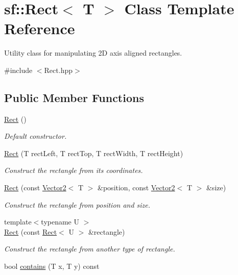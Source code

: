\hypertarget{classsf_1_1Rect}{\section{sf\-:\-:Rect$<$ T $>$ Class Template Reference}
\label{classsf_1_1Rect}
}


Utility class for manipulating 2\-D axis aligned rectangles.  




{\ttfamily \#include $<$Rect.\-hpp$>$}

\subsection*{Public Member Functions}
\begin{DoxyCompactItemize}
\item 
\hyperlink{classsf_1_1Rect_a0f87ebaef9722a6222fd2e04ce8efb37}{Rect} ()
\begin{DoxyCompactList}\small\item\em Default constructor. \end{DoxyCompactList}\item 
\hyperlink{classsf_1_1Rect_a15cdbc5a1aed3a8fc7be1bd5004f19f9}{Rect} (T rect\-Left, T rect\-Top, T rect\-Width, T rect\-Height)
\begin{DoxyCompactList}\small\item\em Construct the rectangle from its coordinates. \end{DoxyCompactList}\item 
\hyperlink{classsf_1_1Rect_a27fdf85caa6d12caeeff78913cc59936}{Rect} (const \hyperlink{classsf_1_1Vector2}{Vector2}$<$ T $>$ \&position, const \hyperlink{classsf_1_1Vector2}{Vector2}$<$ T $>$ \&size)
\begin{DoxyCompactList}\small\item\em Construct the rectangle from position and size. \end{DoxyCompactList}\item 
{\footnotesize template$<$typename U $>$ }\\\hyperlink{classsf_1_1Rect_a6fff2bb7e93677839461a66bc2957de0}{Rect} (const \hyperlink{classsf_1_1Rect}{Rect}$<$ U $>$ \&rectangle)
\begin{DoxyCompactList}\small\item\em Construct the rectangle from another type of rectangle. \end{DoxyCompactList}\item 
bool \hyperlink{classsf_1_1Rect_aa8a5364c84de6dd5299f833b54e31ef1}{contains} (T x, T y) const 

\end{DoxyCompactItemize}
